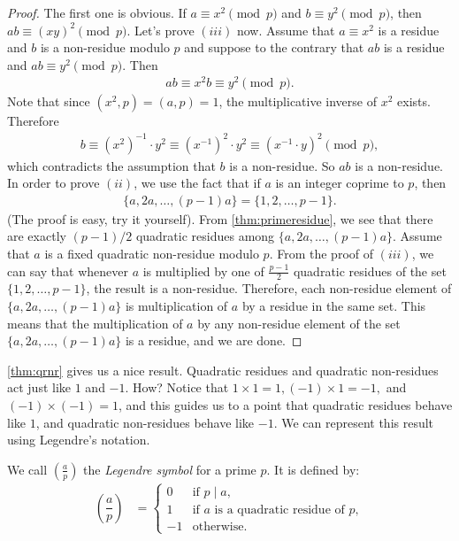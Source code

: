 \documentclass[main.tex]{subfile}
\begin{document}
	\begin{proof}
		The first one is obvious. If $a \equiv x^2 \pmod p$ and $b\equiv y^2 \pmod p$, then $ab \equiv (xy)^2 \pmod p$.
		Let's prove $(iii)$ now. Assume that $a \equiv x^2$ is a residue and $b$ is a non-residue modulo $p$ and suppose to the contrary that $ab$ is a residue and $ab \equiv y^2 \pmod p$. Then
		\begin{align*}
			ab \equiv x^2b \equiv y^2 \pmod p.
		\end{align*}
		Note that since $(x^2,p)=(a,p)=1$, the multiplicative inverse of $x^2$ exists. Therefore
		\begin{align*}
			b \equiv (x^2)^{-1} \cdot y^2 \equiv (x^{-1})^2 \cdot y^2 \equiv (x^{-1} \cdot y)^2 \pmod p,
		\end{align*}
		which contradicts the assumption that $b$ is a non-residue. So $ab$ is a non-residue.
		In order to prove $(ii)$, we use the fact that if $a$ is an integer coprime to $p$, then
		\begin{align*}
			\{a,2a,\ldots,(p-1)a\} = \{ 1,2,\ldots,p-1\}.
		\end{align*}
		(The proof is easy, try it yourself). From \autoref{thm:primeresidue}, we see that there are exactly   $(p-1)/2$ quadratic residues among $\{a,2a,\ldots,(p-1)a\}$. Assume that $a$ is a fixed quadratic non-residue modulo $p$. From the proof of $(iii)$, we can say that whenever $a$ is multiplied by one of $\displaystyle \frac{p-1}{2}$ quadratic residues of the set $\{ 1,2,\ldots,p-1\}$, the result is a non-residue. Therefore, each non-residue element of $\{a,2a,\ldots,(p-1)a\}$ is multiplication of $a$ by a residue in the same set. This means that the multiplication of $a$ by any non-residue element of the set $\{a,2a,\ldots,(p-1)a\}$ is a residue, and we are done.
	\end{proof}

	\autoref{thm:qrnr} gives us a nice result. Quadratic residues and quadratic non-residues act just like $1$ and $-1$. How? Notice that $1 \times 1 =1, (-1) \times 1 =-1,$ and $(-1) \times (-1)=1$, and this guides us to a point that quadratic residues behave like $1$, and quadratic non-residues behave like $-1$. %
	We can represent this result using Legendre's notation.

	\begin{definition}
		We call $\left(\frac{a}{p}\right)$ the {\it Legendre symbol} for a prime $p$. It is defined by:
		\begin{align*}
			\left(\dfrac{a}{p}\right)
			& =
			\begin{cases}
				0 & \mbox{if }p\mid a,\\
				1 &\mbox{if }a\mbox{ is a quadratic residue of }p,\\
				-1 &\mbox{otherwise}.
			\end{cases}
		\end{align*}

	\end{definition}
\end{document}
